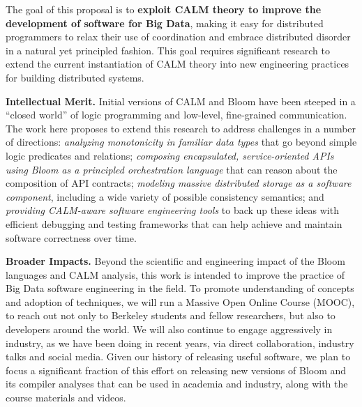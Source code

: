 The goal of this proposal is to \textbf{exploit CALM theory to improve the development of software for Big Data}, making it easy for distributed programmers to relax their use of coordination and embrace distributed disorder in a natural yet principled fashion.  This goal requires significant research to extend the current instantiation of CALM theory into new engineering practices for building distributed systems.  


\vspace{6pt}
\noindent \textbf{Intellectual Merit.} Initial versions of CALM and Bloom have been steeped in a ``closed world'' of logic programming and low-level, fine-grained communication.  The work here proposes to extend this research to address challenges in a number of directions: \emph{analyzing monotonicity in familiar data types} that go beyond simple logic predicates and relations; \emph{composing encapsulated, service-oriented APIs using Bloom as a principled orchestration language} that can reason about the composition of API contracts; \emph{modeling massive distributed storage as a software component}, including a wide variety of possible consistency semantics; and \emph{providing CALM-aware software engineering tools} to back up these ideas with efficient debugging and testing frameworks that can help achieve and maintain software correctness over time.
 
\vspace{6pt}
\noindent \textbf{Broader Impacts.} Beyond the scientific and engineering impact of the Bloom languages and CALM analysis, this work is intended to improve the practice of Big Data software engineering in the field.  To promote understanding of concepts and adoption of techniques, we will run a Massive Open Online Course (MOOC), to reach out not only to Berkeley students and fellow researchers, but also to developers around the world. We will also continue to engage aggressively in industry, as we have been doing in recent years, via direct collaboration, industry talks and social media.  Given our history of releasing useful software, we plan to focus a significant fraction of this effort on releasing new versions of Bloom and its compiler analyses that can be used in academia and industry, along with the course materials and videos.

% 